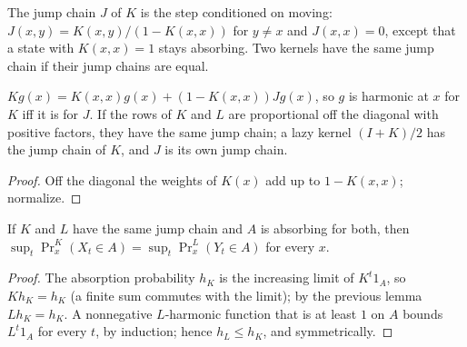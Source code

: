\begin{definition}\label{def:jumpchain}
\leanok{}
The jump chain $J$ of $K$ is the step conditioned on moving: $J(x,y)=K(x,y)/(1-K(x,x))$ for
$y\ne x$ and $J(x,x)=0$, except that a state with $K(x,x)=1$ stays absorbing. Two kernels have
the same jump chain if their jump chains are equal.
\end{definition}
\begin{lemma}\label{lem:jumpchain}
\leanok{}
$Kg(x)=K(x,x)g(x)+(1-K(x,x))Jg(x)$, so $g$ is harmonic at $x$ for $K$ iff it is for $J$. If the
rows of $K$ and $L$ are proportional off the diagonal with positive factors, they have the same
jump chain; a lazy kernel $(I+K)/2$ has the jump chain of $K$, and $J$ is its own jump chain.
\end{lemma}
\begin{proof}\leanok
Off the diagonal the weights of $K(x)$ add up to $1-K(x,x)$; normalize.
\end{proof}
\begin{theorem}\label{thm:jump-absorption}
\leanok{}
If $K$ and $L$ have the same jump chain and $A$ is absorbing for both, then
$\sup_t\Pr^K_x(X_t\in A)=\sup_t\Pr^L_x(Y_t\in A)$ for every $x$.
\end{theorem}
\begin{proof}\leanok
The absorption probability $h_K$ is the increasing limit of $K^t1_A$, so $Kh_K=h_K$ (a finite
sum commutes with the limit); by the previous lemma $Lh_K=h_K$. A nonnegative $L$-harmonic
function that is at least $1$ on $A$ bounds $L^t1_A$ for every $t$, by induction; hence
$h_L\le h_K$, and symmetrically.
\end{proof}
